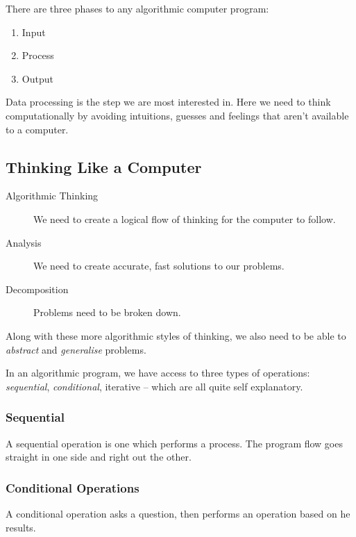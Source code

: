 There are three phases to any algorithmic computer program:
\begin{enumerate}
    \item Input
    \item Process
    \item Output
\end{enumerate}
Data processing is the step we are most interested in.
Here we need to think computationally by avoiding intuitions, guesses and feelings that aren't available to a computer.

\subsection{Thinking Like a Computer}\label{sub:thinking_like_a_computer}

\begin{description}
    \item[Algorithmic Thinking] We need to create a logical flow of thinking for the computer to follow.
    \item[Analysis] We need to create accurate, fast solutions to our problems.
    \item[Decomposition] Problems need to be broken down.
\end{description}
Along with these more algorithmic styles of thinking, we also need to be able to \emph{abstract} and \emph{generalise} problems.

In an algorithmic program, we have access to three types of operations: \emph{sequential}, \emph{conditional}, iterative -- which are all quite self explanatory.

\subsubsection{Sequential}\label{ssub:sequential}

A sequential operation is one which performs a process.
The program flow goes straight in one side and right out the other.

\subsubsection{Conditional Operations}\label{ssub:conditional_operations}

A conditional operation asks a question, then performs an operation based on he results.
